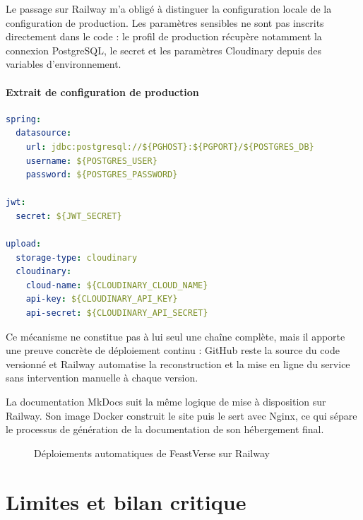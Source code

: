 Le passage sur Railway m'a obligé à distinguer la configuration locale de la configuration de production. Les paramètres sensibles ne sont pas inscrits directement dans le code : le profil de production récupère notamment la connexion PostgreSQL, le secret  et les paramètres Cloudinary depuis des variables d'environnement.

\paragraph{Extrait de configuration de production}

\begin{lstlisting}[language=yaml,caption={Configuration de production par variables d'environnement},label={lst:feastverse-config-prod}]
spring:
  datasource:
    url: jdbc:postgresql://${PGHOST}:${PGPORT}/${POSTGRES_DB}
    username: ${POSTGRES_USER}
    password: ${POSTGRES_PASSWORD}

jwt:
  secret: ${JWT_SECRET}

upload:
  storage-type: cloudinary
  cloudinary:
    cloud-name: ${CLOUDINARY_CLOUD_NAME}
    api-key: ${CLOUDINARY_API_KEY}
    api-secret: ${CLOUDINARY_API_SECRET}
\end{lstlisting}

Ce mécanisme ne constitue pas à lui seul une chaîne  complète, mais il apporte une preuve concrète de déploiement continu : GitHub reste la source du code versionné et Railway automatise la reconstruction et la mise en ligne du service sans intervention manuelle à chaque version.

La documentation MkDocs suit la même logique de mise à disposition sur Railway. Son image Docker construit le site puis le sert avec Nginx, ce qui sépare le processus de génération de la documentation de son hébergement final.

\begin{figure}[H]
\centering
{}
\caption{Déploiements automatiques de FeastVerse sur Railway}
\label{fig:railway-feastverse}
\end{figure}

\section{Limites et bilan critique}

